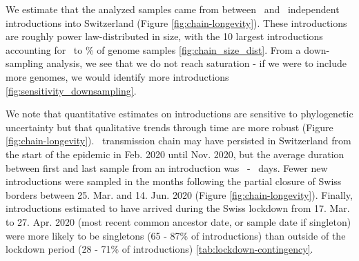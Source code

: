\documentclass[9pt,twocolumn,twoside,lineno]{pnas-new}
\begin{document}
We estimate that the analyzed samples came from between \nchainsmin\ and \nchainsmax\ independent introductions into Switzerland (Figure \ref{fig:chain-longevity}). These introductions are roughly power law-distributed in size, with the 10 largest introductions accounting for \maxlargestchainsper\ to \minlargestchainsper \% of genome samples \ref{fig:chain_size_dist}. From a down-sampling analysis, we see that we do not reach saturation - if we were to include more genomes, we would identify more introductions \ref{fig:sensitivity_downsampling}. 


We note that quantitative estimates on introductions are sensitive to phylogenetic uncertainty but that qualitative trends through time are more robust (Figure \ref{fig:chain-longevity}). \nspanningchainsfebnovmin\ transmission chain may have persisted in Switzerland from the start of the epidemic in Feb. 2020 until Nov. 2020, but the average duration between first and last sample from an introduction was \meantimetolastsamplemax\ - \meantimetolastsamplemin\ days. Fewer new introductions were sampled in the months following the partial closure of Swiss borders between 25. Mar. and 14. Jun. 2020 (Figure \ref{fig:chain-longevity}). Finally, introductions estimated to have arrived during the Swiss lockdown from 17. Mar. to 27. Apr. 2020 (most recent common ancestor date, or sample date if singleton) were more likely to be singletons (65 - 87\% of introductions) than outside of the lockdown period (28 - 71\% of introductions) \ref{tab:lockdown-contingency}.
\end{document}
